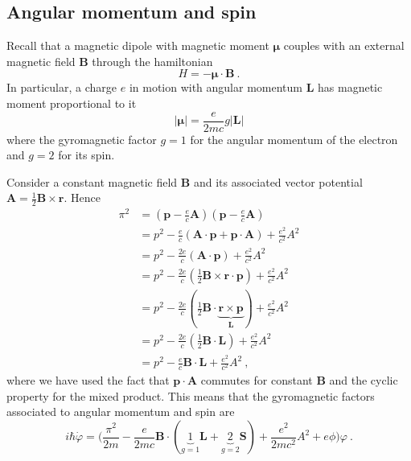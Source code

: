 \subsection{Angular momentum and spin}

    Recall that a magnetic dipole with magnetic moment $\boldsymbol \mu$ couples with an external magnetic field $\mathbf B$ through the hamiltonian 
    \begin{equation*}
        H = - \boldsymbol \mu \cdot \mathbf B ~.
    \end{equation*}
    In particular, a charge $e$ in motion with angular momentum $\mathbf L$ has magnetic moment proportional to it 
    \begin{equation*}
        |\boldsymbol \mu| = \frac{e}{2mc} g |\mathbf L|
    \end{equation*}
    where the gyromagnetic factor $g = 1$ for the angular momentum of the electron and $g = 2$ for its spin.
    \begin{example}
        Consider a constant magnetic field $\mathbf B$ and its associated vector potential $\mathbf A = \frac{1}{2} \mathbf B \times \mathbf r$. Hence 
        \begin{equation*}
        \begin{aligned}
            \pi^2 & = (\mathbf p - \frac{e}{c} \mathbf A) (\mathbf p - \frac{e}{c} \mathbf A) \\ & = p^2 - \frac{e}{c} (\mathbf A \cdot \mathbf p + \mathbf p \cdot \mathbf A) + \frac{e^2}{c^2} A^2 \\ & = p^2 - \frac{2e}{c} (\mathbf A \cdot \mathbf p) + \frac{e^2}{c^2} A^2 \\ & = p^2 - \frac{2e}{c} (\frac{1}{2} \mathbf B \times \mathbf r \cdot \mathbf p) + \frac{e^2}{c^2} A^2 \\ & = p^2 - \frac{2e}{c} (\frac{1}{2} \mathbf B \cdot \underbrace{\mathbf r \times \mathbf p}_{\mathbf L}) + \frac{e^2}{c^2} A^2 \\ & = p^2 - \frac{2e}{c} (\frac{1}{2} \mathbf B \cdot \mathbf L) + \frac{e^2}{c^2} A^2 \\ & = p^2 - \frac{e}{c} \mathbf B \cdot \mathbf L + \frac{e^2}{c^2} A^2 ~,
        \end{aligned}
        \end{equation*}
        where we have used the fact that $\mathbf p \cdot \mathbf A$ commutes for constant $\mathbf B$ and the cyclic property for the mixed product. This means that the gyromagnetic factors associated to angular momentum and spin are
        \begin{equation*}
            i \hbar \dot \varphi = \Big ( \frac{\pi^2}{2m} - \frac{e}{2mc} \mathbf B \cdot (\underbrace{1}_{g=1}\mathbf L + \underbrace{2}_{g=2}\mathbf S) + \frac{e^2}{2 m c^2} A^2 + e \phi \Big) \varphi ~.
        \end{equation*}
    \end{example}

